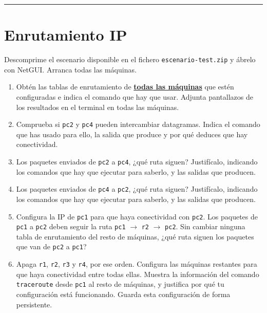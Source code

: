 \documentclass[a4paper]{article}
\begin{document}
\medskip
\hrule

\bigskip

\section{Enrutamiento IP}
\label{sec:ip-routing}

Descomprime el escenario disponible en el fichero \texttt{escenario-test.zip} y ábrelo con NetGUI. 
Arranca todas las máquinas.

\begin{enumerate}
	\item  Obtén las tablas de enrutamiento de \textbf{\underline{todas las máquinas}} que estén 
	configuradas e indica el comando que hay que usar. Adjunta pantallazos de los resultados en el 
	terminal en todas las máquinas.
	
	\item Comprueba si \texttt{pc2} y \texttt{pc4} pueden intercambiar datagramas. Indica el comando
	que has usado para ello, la salida que produce y por qué deduces que hay conectividad.
	
	\item Los paquetes enviados de \texttt{pc2} a \texttt{pc4}, ¿qué ruta siguen? Justifícalo, indicando
	los comandos que hay que ejecutar para saberlo, y las salidas que producen.
	
	\item Los paquetes enviados de \texttt{pc4} a \texttt{pc2}, ¿qué ruta siguen? Justifícalo, indicando 
	los comandos que hay que ejecutar para saberlo, y las salidas que producen.
	
	\item Configura la IP de \texttt{pc1} para que haya conectividad con \texttt{pc2}. Los paquetes de
	\texttt{pc1} a \texttt{pc2} deben seguir la ruta \texttt{pc1} $\rightarrow$ \texttt{r2} $\rightarrow$
	\texttt{pc2}. Sin cambiar ninguna tabla de enrutamiento del resto de máquinas, ¿qué ruta siguen
	los paquetes que van de \texttt{pc2} a \texttt{pc1}?
	
	\item Apaga \texttt{r1}, \texttt{r2}, \texttt{r3} y \texttt{r4}, por ese orden. Configura las máquinas
	restantes para que haya conectividad entre todas ellas. Muestra la información del comando 
	\texttt{traceroute} desde \texttt{pc1} al resto de máquinas, y justifica por qué tu configuración está 
	funcionando. Guarda esta configuración de forma persistente.
\end{enumerate}
\end{document}
